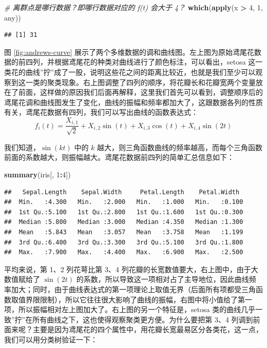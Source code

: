 \documentclass[
  b5paper,
  UTF8,twoside]{book}
\newenvironment{Shaded}{\begin{snugshade}}{\end{snugshade}}
\newcommand{\CommentTok}[1]{\textcolor[rgb]{0.56,0.35,0.01}{\textit{#1}}}
\newcommand{\DecValTok}[1]{\textcolor[rgb]{0.00,0.00,0.81}{#1}}
\newcommand{\FunctionTok}[1]{\textcolor[rgb]{0.13,0.29,0.53}{\textbf{#1}}}
\newcommand{\NormalTok}[1]{#1}
\newcommand{\SpecialCharTok}[1]{\textcolor[rgb]{0.81,0.36,0.00}{\textbf{#1}}}
\begin{document}
\begin{Shaded}
\begin{Highlighting}[]
\CommentTok{\# 离群点是哪行数据？即哪行数据对应的 f(t) 会大于 4？}
\FunctionTok{which}\NormalTok{(}\FunctionTok{apply}\NormalTok{(x }\SpecialCharTok{\textgreater{}} \DecValTok{4}\NormalTok{, }\DecValTok{1}\NormalTok{, any))}
\end{Highlighting}
\end{Shaded}

\begin{verbatim}
## [1] 31
\end{verbatim}

图 \ref{fig:andrews-curve}
展示了两个多维数据的调和曲线图。左上图为原始鸢尾花数据的前四列，并根据鸢尾花的种类对曲线进行了颜色标注，可以看出，setosa 这一类花的曲线''拧''成了一股，说明这些花之间的距离比较近，也就是我们至少可以观察到这一类的聚类现象。右上图调整了四列的顺序，将花瓣长和花瓣宽两个变量放在了前面，这样做的原因我们后面再解释，这里我们首先可以看到，调整顺序后的鸢尾花调和曲线图发生了变化，曲线的振幅和频率都加大了，这跟数据各列的性质有关，鸢尾花数据有四列，我们可以写出曲线的函数表达式：
\[f_{i}(t)=\frac{X_{i,1}}{\sqrt{2}}+X_{i,2}\sin(t)+X_{i,3}\cos(t)+X_{i,4}\sin(2t)\]

我们知道，\(\sin(kt)\) 中的 \(k\) 越大，则三角函数曲线的频率越高，而每个三角函数前面的系数越大，则振幅越大。鸢尾花数据前四列的简单汇总信息如下：

\begin{Shaded}
\begin{Highlighting}[]
\FunctionTok{summary}\NormalTok{(iris[, }\DecValTok{1}\SpecialCharTok{:}\DecValTok{4}\NormalTok{])}
\end{Highlighting}
\end{Shaded}

\begin{verbatim}
##   Sepal.Length    Sepal.Width     Petal.Length    Petal.Width   
##  Min.   :4.300   Min.   :2.000   Min.   :1.000   Min.   :0.100  
##  1st Qu.:5.100   1st Qu.:2.800   1st Qu.:1.600   1st Qu.:0.300  
##  Median :5.800   Median :3.000   Median :4.350   Median :1.300  
##  Mean   :5.843   Mean   :3.057   Mean   :3.758   Mean   :1.199  
##  3rd Qu.:6.400   3rd Qu.:3.300   3rd Qu.:5.100   3rd Qu.:1.800  
##  Max.   :7.900   Max.   :4.400   Max.   :6.900   Max.   :2.500
\end{verbatim}

平均来说，第 1、2 列花萼比第 3、4 列花瓣的长宽数值要大，右上图中，由于大数值赋给了 \(\sin(2t)\) 的系数，所以导致这一项相对占了主导地位，因此曲线频率加大；同时，由于曲线表达式的第一项理论上取值无界（后面所有项都受三角函数取值界限限制），所以它往往很大影响了曲线的振幅，右图中将小值给了第一项，所以振幅相对左上图加大了。右上图的另一个特征是，setosa 类的曲线几乎一致''拧''在所有曲线之下，这也使得观察聚类更方便。为什么要把第 3、4 列调到前面来呢？主要是因为鸢尾花的四个属性中，用花瓣长宽最易区分各类花，这一点，我们可以用分类树验证一下：
\end{document}
